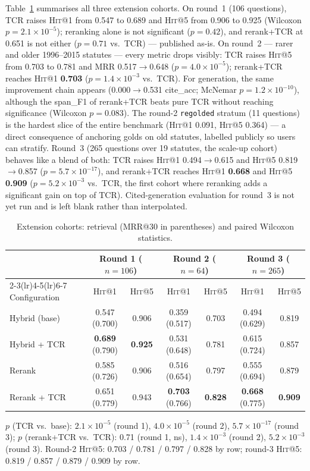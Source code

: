\documentclass[10pt,a4paper,twocolumn]{article}
\newcommand{\hit}{\textsc{Hit}}
\newcommand{\code}[1]{\texttt{#1}}
\begin{document}
Table~\ref{tab:ext} summarises all three extension cohorts. On round~1 (106 questions), TCR raises \hit{}@1 from 0.547 to 0.689 and \hit{}@5 from 0.906 to 0.925 (Wilcoxon $p=2.1\times10^{-5}$); reranking alone is not significant ($p=0.42$), and rerank+TCR at 0.651 is not either ($p=0.71$ vs.\ TCR) --- published as-is. On round~2 --- rarer and older 1996--2015 statutes --- every metric drops visibly: TCR raises \hit{}@5 from 0.703 to 0.781 and MRR 0.517$\rightarrow$0.648 ($p=4.0\times10^{-5}$); rerank+TCR reaches \hit{}@1 \textbf{0.703} ($p=1.4\times10^{-3}$ vs.\ TCR). For generation, the same improvement chain appears (0.000$\rightarrow$0.531 cite\_acc; McNemar $p=1.2\times10^{-10}$), although the span\_F1 of rerank+TCR beats pure TCR without reaching significance (Wilcoxon $p=0.083$). The round-2 \code{regolded} stratum (11 questions) is the hardest slice of the entire benchmark (\hit{}@1 0.091, \hit{}@5 0.364) --- a direct consequence of anchoring golds on old statutes, labelled publicly so users can stratify. Round~3 (265 questions over 19 statutes, the scale-up cohort) behaves like a blend of both: TCR raises \hit{}@1 0.494$\rightarrow$0.615 and \hit{}@5 0.819$\rightarrow$0.857 ($p=5.7\times10^{-17}$), and rerank+TCR reaches \hit{}@1 \textbf{0.668} and \hit{}@5 \textbf{0.909} ($p=5.2\times10^{-3}$ vs.\ TCR, the first cohort where reranking adds a significant gain on top of TCR). Cited-generation evaluation for round~3 is not yet run and is left blank rather than interpolated.

\begin{table}[t]
\centering\small
\caption{Extension cohorts: retrieval (MRR@30 in parentheses) and paired Wilcoxon statistics.}
\label{tab:ext}
\setlength{\tabcolsep}{2.6pt}
\begin{tabular}{lcccccc}
\toprule
 & \multicolumn{2}{c}{Round 1 ($n{=}106$)} & \multicolumn{2}{c}{Round 2 ($n{=}64$)} & \multicolumn{2}{c}{Round 3 ($n{=}265$)} \\
\cmidrule(lr){2-3}\cmidrule(lr){4-5}\cmidrule(lr){6-7}
Configuration & \hit{}@1 & \hit{}@5 & \hit{}@1 & \hit{}@5 & \hit{}@1 & \hit{}@5 \\
\midrule
Hybrid (base) & 0.547 (0.700) & 0.906 & 0.359 (0.517) & 0.703 & 0.494 (0.629) & 0.819 \\
Hybrid + TCR & \textbf{0.689} (0.790) & \textbf{0.925} & 0.531 (0.648) & 0.781 & 0.615 (0.724) & 0.857 \\
Rerank & 0.585 (0.726) & 0.906 & 0.516 (0.654) & 0.797 & 0.555 (0.694) & 0.879 \\
Rerank + TCR & 0.651 (0.779) & 0.943 & \textbf{0.703} (0.766) & \textbf{0.828} & \textbf{0.668} (0.775) & \textbf{0.909} \\
\bottomrule
\end{tabular}

\vspace{3pt}
{\footnotesize $p$ (TCR vs.\ base): $2.1\times10^{-5}$ (round 1), $4.0\times10^{-5}$ (round 2), $5.7\times10^{-17}$ (round 3); $p$ (rerank+TCR vs.\ TCR): 0.71 (round 1, ns), $1.4\times10^{-3}$ (round 2), $5.2\times10^{-3}$ (round 3). Round-2 \hit{}@5: 0.703 / 0.781 / 0.797 / 0.828 by row; round-3 \hit{}@5: 0.819 / 0.857 / 0.879 / 0.909 by row.}
\end{table}
\end{document}
